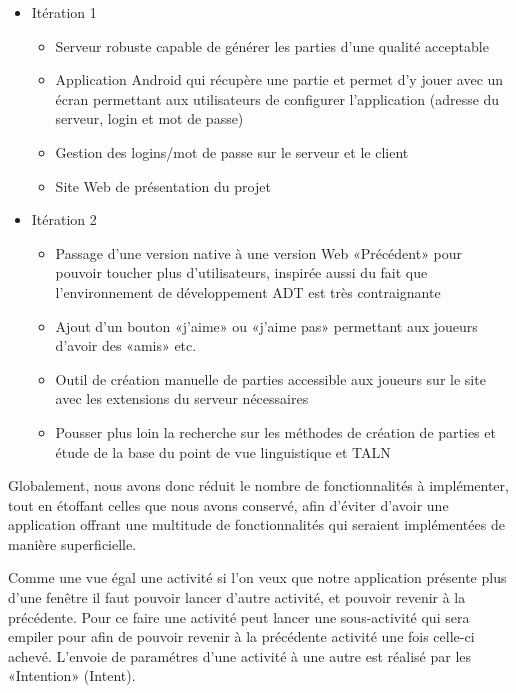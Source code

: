 \documentclass[a4paper,11pt,french]{article}
\def\android{Android\texttrademark{}}
\begin{document}
\begin{itemize}
\item Itération 1 
  \begin{itemize}
  \item Serveur robuste capable de générer les parties d'une qualité acceptable
  \item Application \android{} qui récupère une partie et permet d'y jouer avec un écran permettant aux utilisateurs de configurer
    l'application (adresse du serveur, login et mot de passe)
  \item Gestion des logins/mot de passe sur le serveur et le client
  \item Site Web de présentation du projet
  \end{itemize}
\item Itération 2
  \begin{itemize}
  \item Passage d'une version native à une version Web «Précédent» pour pouvoir toucher plus d'utilisateurs, inspirée aussi du fait que l'environnement de développement ADT est très contraignante
  \item Ajout d'un bouton «j'aime» ou «j'aime pas» permettant aux joueurs d'avoir des «amis» etc.
  \item Outil de création manuelle de parties accessible aux joueurs sur le site avec les extensions du serveur nécessaires
  \item Pousser plus loin la recherche sur les méthodes de création de parties et étude de la base du point de vue linguistique et TALN
  \end{itemize}
\end{itemize}

Globalement, nous avons donc réduit le nombre de fonctionnalités à implémenter, tout en étoffant celles que nous avons conservé, afin
d'éviter d'avoir une application offrant une multitude de fonctionnalités qui seraient implémentées de manière superficielle.

Comme une vue égal une activité si l'on veux que notre application présente plus d'une fenêtre il faut pouvoir lancer d'autre activité, et pouvoir revenir à la précédente. Pour ce faire une activité peut lancer une sous-activité qui sera empiler pour afin de pouvoir revenir à la précédente activité une fois celle-ci achevé. L'envoie de paramétres d'une activité à une autre est réalisé par les «Intention» (Intent).



\end{document}

